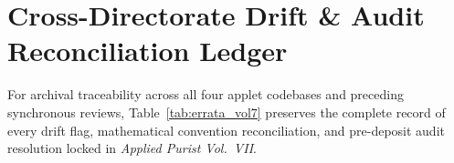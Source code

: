 \documentclass[11pt,a4paper,reqno]{article}
\theoremstyle{plain}
\theoremstyle{definition}
\theoremstyle{remark}
\numberwithin{equation}{section}
\numberwithin{table}{section}
\begin{document}
\appendix
\section{Cross-Directorate Drift \& Audit Reconciliation Ledger}
\label{app:errata_ledger}

For archival traceability across all four applet codebases and preceding synchronous reviews, Table~\ref{tab:errata_vol7} preserves the complete record of every drift flag, mathematical convention reconciliation, and pre-deposit audit resolution locked in \emph{Applied Purist Vol.~VII}.

\scriptsize
\setlength{\tabcolsep}{4pt}
\end{document}
